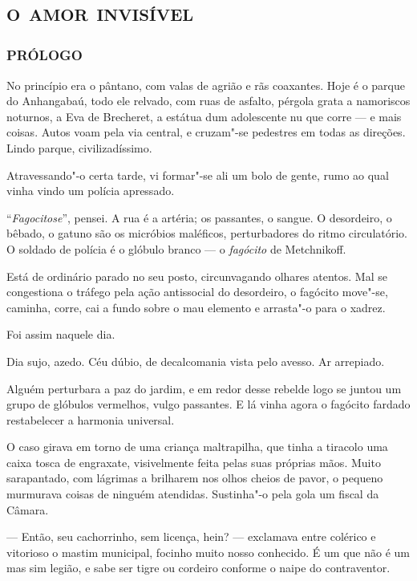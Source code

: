 \part{\textsc{o amor invisível}}


\section*{PRÓLOGO}

No princípio era o pântano, com valas de agrião e rãs coaxantes. Hoje é
o parque do Anhangabaú, todo ele relvado, com ruas de asfalto, pérgola
grata a namoriscos noturnos, a Eva de Brecheret, a estátua dum
adolescente nu que corre --- e mais coisas. Autos voam pela via central,
e cruzam"-se pedestres em todas as direções. Lindo parque,
civilizadíssimo.

Atravessando"-o certa tarde, vi formar"-se ali um bolo de gente, rumo ao
qual vinha vindo um polícia apressado.

``\emph{Fagocitose}'', pensei. A rua é a artéria; os passantes, o
sangue. O desordeiro, o bêbado, o gatuno são os micróbios maléficos,
perturbadores do ritmo circulatório. O soldado de polícia é o glóbulo
branco --- o \emph{fagócito} de Metchnikoff.

Está de ordinário parado no seu posto, circunvagando olhares atentos.
Mal se congestiona o tráfego pela ação antissocial do desordeiro, o
fagócito move"-se, caminha, corre, cai a fundo sobre o mau elemento e
arrasta"-o para o xadrez.

Foi assim naquele dia.

Dia sujo, azedo. Céu dúbio, de decalcomania vista pelo avesso. Ar
arrepiado.

Alguém perturbara a paz do jardim, e em redor desse rebelde logo se
juntou um grupo de glóbulos vermelhos, vulgo passantes. E lá vinha agora
o fagócito fardado restabelecer a harmonia universal.

O caso girava em torno de uma criança maltrapilha, que tinha a tiracolo
uma caixa tosca de engraxate, visivelmente feita pelas suas próprias
mãos. Muito sarapantado, com lágrimas a brilharem nos olhos cheios de
pavor, o pequeno murmurava coisas de ninguém atendidas. Sustinha"-o pela
gola um fiscal da Câmara.

--- Então, seu cachorrinho, sem licença, hein? --- exclamava entre
colérico e vitorioso o mastim municipal, focinho muito nosso conhecido.
É um que não é um mas sim legião, e sabe ser tigre ou cordeiro conforme
o naipe do contraventor.

